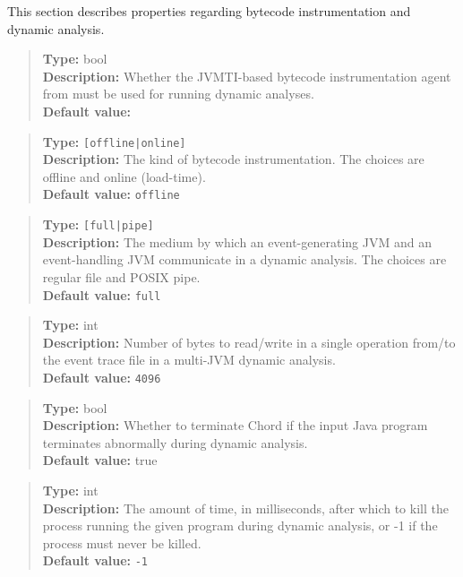This section describes properties regarding bytecode instrumentation and dynamic analysis.

\begin{quote}
{\bf Type:} bool \\
{\bf Description:} Whether the JVMTI-based bytecode instrumentation agent from  must be used for running dynamic analyses. \\
{\bf Default value:} 
\end{quote}

\begin{quote}
{\bf Type:} {\tt [offline|online]}  \\
{\bf Description:} The kind of bytecode instrumentation.  The choices are offline and online (load-time).  \\
{\bf Default value:} {\tt offline}
\end{quote}

\begin{quote}
{\bf Type:} {\tt [full|pipe]}  \\
{\bf Description:} The medium by which an event-generating JVM and an event-handling JVM communicate in a dynamic analysis.  The choices are regular file and POSIX pipe.  \\
{\bf Default value:} {\tt full} 
\end{quote}

\begin{quote}
{\bf Type:} int \\
{\bf Description:} Number of bytes to read/write in a single operation from/to the event trace file in a multi-JVM dynamic analysis. \\
{\bf Default value:} {\tt 4096}
\end{quote}

\begin{quote}
{\bf Type:} bool \\
{\bf Description:} Whether to terminate Chord if the input Java program terminates abnormally during dynamic analysis. \\
{\bf Default value:} true
\end{quote}

\begin{quote}
{\bf Type:} int  \\
{\bf Description:} The amount of time, in milliseconds, after which to kill the process running the given program during dynamic analysis, or -1 if the process must never be killed. \\
{\bf Default value:} {\tt -1}
\end{quote}

